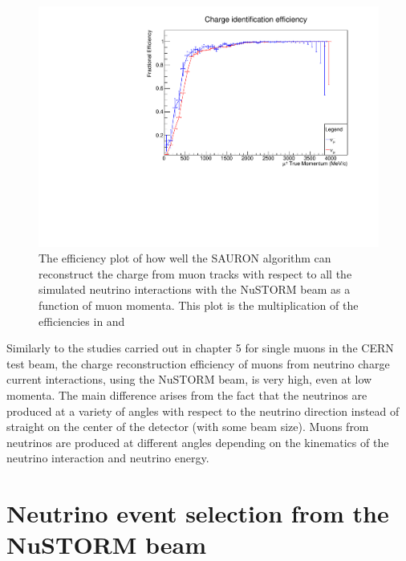\begin{figure}[h!]
\centering
\includegraphics[width=.9\textwidth]{figures/NeutrinoChap/CombinedNuStormChargeFittedEff.pdf}
\caption{The efficiency plot of how well the SAURON algorithm can reconstruct the charge from muon tracks with respect to all the simulated neutrino interactions with the NuSTORM beam as a function of muon momenta. This plot is the multiplication of the efficiencies in  and }
\label{fig:NuSTORMTASDCombined}
\end{figure}

Similarly to the studies carried out in chapter 5 for single muons in the CERN test beam, the charge reconstruction efficiency of muons from neutrino charge current interactions, using the NuSTORM beam, is very high, even at low momenta. The main difference arises from the fact that the neutrinos are produced at a variety of angles with respect to the neutrino direction instead of straight on the center of the detector (with some beam size). Muons from neutrinos are produced at different angles depending on the kinematics of the neutrino interaction and neutrino energy. 

\section{Neutrino event selection from the NuSTORM beam}


